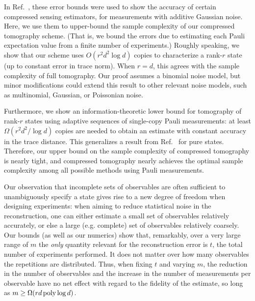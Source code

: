 In Ref.~\cite{Candes2011}, these error bounds were used to show the accuracy of certain compressed sensing estimators, for measurements with additive Gaussian noise.  Here, we use them to upper-bound the sample complexity of our compressed tomography scheme.  (That is, we bound the errors due to estimating each Pauli expectation value from a finite number of experiments.)  Roughly speaking, we show that our scheme uses $O(r^2d^2\log d)$ copies to characterize a rank-$r$ state (up to constant error in trace norm).  When $r = d$, this agrees with the sample complexity of full tomography. Our proof assumes a binomial noise model, but minor modifications could extend this result to other relevant noise models, such as multinomial, Gaussian, or Poissonian noise. 

Furthermore, we show an information-theoretic lower bound for tomography of rank-$r$ states using adaptive sequences of single-copy Pauli measurements: at least $\Omega(r^2 d^2/\log d)$ copies are needed to obtain an estimate with constant accuracy in the trace distance. This generalizes a result from Ref.~\cite{Flammia2011} for pure states. 
Therefore, our upper bound on the sample complexity of compressed tomography is nearly tight, and compressed tomography nearly achieves the optimal sample complexity among all possible methods using Pauli measurements.

Our observation that incomplete sets of observables are often sufficient to unambiguously specify a state gives rise to a new degree of freedom when designing experiments: when aiming to reduce statistical noise in the reconstruction, one can either estimate a small set of observables relatively accurately, or else a large (e.g. complete) set of observables relatively coarsely. Our bounds (as well as our numerics) show that, remarkably, over a very large range of $m$ the \emph{only} quantity relevant for the reconstruction error is $t$, the total number of experiments performed. It does not matter over how many observables the repetitions are distributed. Thus, when fixing $t$ and varying $m$, the reduction in the number of observables and the increase in the number of measurements per observable have no net effect with regard to the fidelity of the estimate, so long as $m \ge \Omega(rd \operatorname{poly}\log d)$. 



